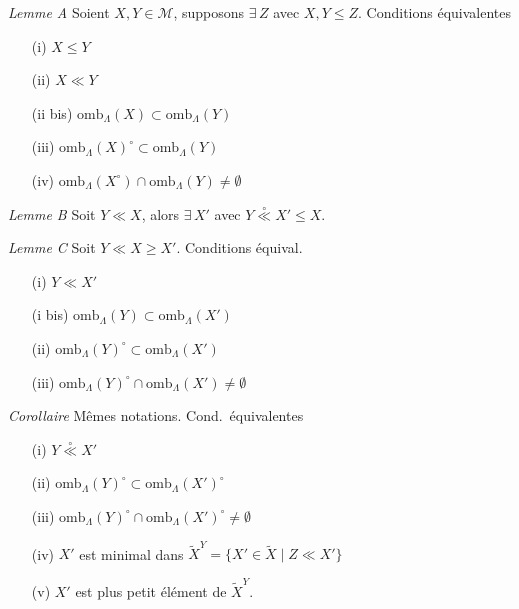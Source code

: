 \documentclass[11pt,a4paper]{article}
\begin{document}
\emph{Lemme A} Soient $X, Y \in \mathcal{M}$, supposons $\exists\, Z$ avec $X, Y \leq Z$. Conditions équivalentes
\begin{itemize}
  \item[(i)] $X \leq Y$
  \item[(ii)] $X \ll Y$
  \item[(ii bis)] $\mathrm{omb}_{\Lambda}(X) \subset \mathrm{omb}_{\Lambda}(Y)$
  \item[(iii)] $\mathrm{omb}_{\Lambda}(X)^{\circ} \subset \mathrm{omb}_{\Lambda}(Y)$
  \item[(iv)] $\mathrm{omb}_{\Lambda}(X^{\circ}) \cap \mathrm{omb}_{\Lambda}(Y) \neq \emptyset$
\end{itemize}

\emph{Lemme B} Soit $Y \ll X$, alors $\exists\, X'$ avec $Y \mathrel{\overset{\circ}{\ll}} X' \leq X$.

\emph{Lemme C} Soit $Y \ll X \geq X'$. Conditions équival.
\begin{itemize}
  \item[(i)] $Y \ll X'$
  \item[(i bis)] $\mathrm{omb}_{\Lambda}(Y) \subset \mathrm{omb}_{\Lambda}(X')$
  \item[(ii)] $\mathrm{omb}_{\Lambda}(Y)^{\circ} \subset \mathrm{omb}_{\Lambda}(X')$
  \item[(iii)] $\mathrm{omb}_{\Lambda}(Y)^{\circ} \cap \mathrm{omb}_{\Lambda}(X') \neq \emptyset$
\end{itemize}

\emph{Corollaire} Mêmes notations. Cond.\ équivalentes
\begin{itemize}
  \item[(i)] $Y \mathrel{\overset{\circ}{\ll}} X'$
  \item[(ii)] $\mathrm{omb}_{\Lambda}(Y)^{\circ} \subset \mathrm{omb}_{\Lambda}(X')^{\circ}$
  \item[(iii)] $\mathrm{omb}_{\Lambda}(Y)^{\circ} \cap \mathrm{omb}_{\Lambda}(X')^{\circ} \neq \emptyset$
  \item[(iv)] $X'$ est minimal dans $\widetilde{X}^{Y} = \lbrace X' \in \widetilde{X} \mid Z \ll X' \rbrace$
  \item[(v)] $X'$ est plus petit élément de $\widetilde{X}^{Y}$.
\end{itemize}
\end{document}
